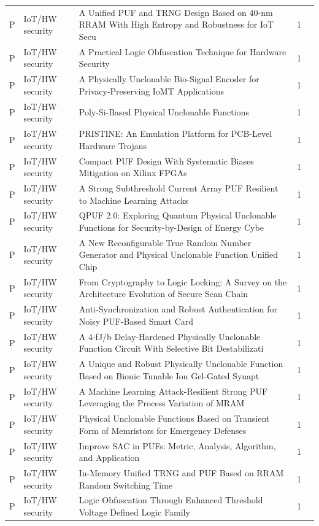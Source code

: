 \documentclass[10pt]{article}
\begin{document}
\begin{longtable}{@{}llL{8.6cm}lL{4.2cm}@{}}
P & IoT/HW security & A Unified PUF and TRNG Design Based on 40-nm RRAM With High Entropy and Robustness for IoT Secu & 1 &  \\
P & IoT/HW security & A Practical Logic Obfuscation Technique for Hardware Security & 1 &  \\
P & IoT/HW security & A Physically Unclonable Bio-Signal Encoder for Privacy-Preserving IoMT Applications & 1 &  \\
P & IoT/HW security & Poly-Si-Based Physical Unclonable Functions & 1 &  \\
P & IoT/HW security & PRISTINE: An Emulation Platform for PCB-Level Hardware Trojans & 1 &  \\
P & IoT/HW security & Compact PUF Design With Systematic Biases Mitigation on Xilinx FPGAs & 1 &  \\
P & IoT/HW security & A Strong Subthreshold Current Array PUF Resilient to Machine Learning Attacks & 1 &  \\
P & IoT/HW security & QPUF 2.0: Exploring Quantum Physical Unclonable Functions for Security-by-Design of Energy Cybe & 1 &  \\
P & IoT/HW security & A New Reconfigurable True Random Number Generator and Physical Unclonable Function Unified Chip & 1 &  \\
P & IoT/HW security & From Cryptography to Logic Locking: A Survey on the Architecture Evolution of Secure Scan Chain & 1 &  \\
P & IoT/HW security & Anti-Synchronization and Robust Authentication for Noisy PUF-Based Smart Card & 1 &  \\
P & IoT/HW security & A 4-fJ/b Delay-Hardened Physically Unclonable Function Circuit With Selective Bit Destabilizati & 1 &  \\
P & IoT/HW security & A Unique and Robust Physically Unclonable Function Based on Bionic Tunable Ion Gel-Gated Synapt & 1 &  \\
P & IoT/HW security & A Machine Learning Attack-Resilient Strong PUF Leveraging the Process Variation of MRAM & 1 &  \\
P & IoT/HW security & Physical Unclonable Functions Based on Transient Form of Memristors for Emergency Defenses & 1 &  \\
P & IoT/HW security & Improve SAC in PUFs: Metric, Analysis, Algorithm, and Application & 1 &  \\
P & IoT/HW security & In-Memory Unified TRNG and PUF Based on RRAM Random Switching Time & 1 &  \\
P & IoT/HW security & Logic Obfuscation Through Enhanced Threshold Voltage Defined Logic Family & 1 &  \\

\end{longtable}
\end{document}
